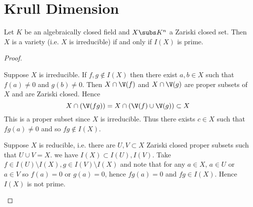 \section{Krull Dimension}

\begin{lem}
    Let $K$ be an algebraically closed field and $X \subs K^n$ 
    a Zariski closed set.
    Then $X$ is a variety (i.e. $X$ is irreducible) 
    if and only if $I(X)$ is prime.
\end{lem}
\begin{proof}
    \begin{forward}
        Suppose $X$ is irreducible.
        If $f,g \notin I(X)$ then there exist $a,b \in X$ such that 
        $f(a) \ne 0$ and $g(b) \ne 0$.
        Then $X \cap \V(f)$ and $X \cap \V(g)$ are proper subsets of $X$ and 
        are Zariski closed.
        Hence 
        \[X \cap (\V(fg)) = X \cap (\V(f) \cup \V(g)) \subset X\]
        This is a proper subset since $X$ is irreducible.
        Thus there exists $c \in X$ such that $fg(a) \ne 0$
        and so $fg \notin I(X)$.
    \end{forward}

    \begin{backward}
        Suppose $X$ is reducible, i.e. there are $U,V \subset X$ Zariski closed 
        proper subsets such that $U \cup V = X$.
        we have $I(X) \subset I(U), I(V)$.
        Take $f \in I(U) \setminus I(X), g \in I(V) \setminus I(X)$ and note 
        that for any $a \in X$, 
        $a \in U$ or $a \in V$ so $f(a) = 0$ or $g(a) = 0$,
        hence $fg(a) = 0$ and $fg \in I(X)$.
        Hence $I(X)$ is not prime.
    \end{backward}
\end{proof}

